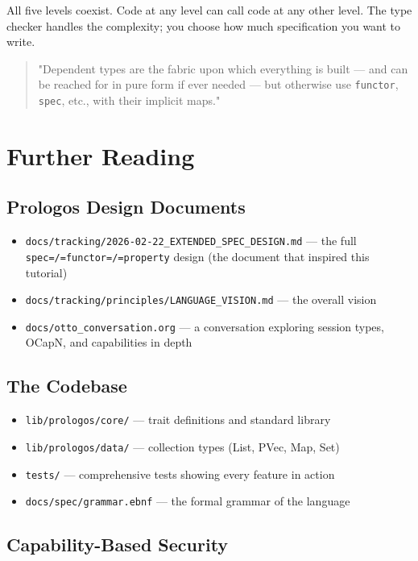 \documentclass[11pt]{article}
\begin{document}
All five levels coexist. Code at any level can call code at any other
level. The type checker handles the complexity; you choose how much
specification you want to write.

\begin{quote}
"Dependent types are the fabric upon which everything is built --- and
can be reached for in pure form if ever needed --- but otherwise use
\texttt{functor}, \texttt{spec}, etc., with their implicit maps."
\end{quote}
\section{Further Reading}
\label{sec:org8d346bf}

\subsection{Prologos Design Documents}
\label{sec:org08f4865}

\begin{itemize}
\item \texttt{docs/tracking/2026-02-22\_EXTENDED\_SPEC\_DESIGN.md} --- the full \texttt{spec=/=functor=/=property} design (the document that inspired this tutorial)
\item \texttt{docs/tracking/principles/LANGUAGE\_VISION.md} --- the overall vision
\item \texttt{docs/otto\_conversation.org} --- a conversation exploring session types, OCapN, and capabilities in depth
\end{itemize}
\subsection{The Codebase}
\label{sec:org7457e98}

\begin{itemize}
\item \texttt{lib/prologos/core/} --- trait definitions and standard library
\item \texttt{lib/prologos/data/} --- collection types (List, PVec, Map, Set)
\item \texttt{tests/} --- comprehensive tests showing every feature in action
\item \texttt{docs/spec/grammar.ebnf} --- the formal grammar of the language
\end{itemize}
\subsection{Capability-Based Security}
\label{sec:org316193d}
\end{document}
